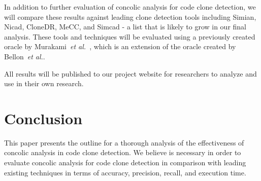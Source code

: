 \documentclass{sig-alternate}
\begin{document}
In addition to further evaluation of concolic analysis for code clone detection, we will compare these results against leading clone detection tools including Simian, Nicad, CloneDR, MeCC, and Simcad - a list that is likely to grow in our final analysis. These tools and techniques will be evaluated using a previously created oracle by Murakami~\emph{et al.}~\cite{Murakami:2014:DCR:2597073.2597133}, which is an extension of the oracle created by Bellon~\emph{et al.}\cite{Bellon07comparisonand}.


All results will be published to our project website for researchers to analyze and use in their own research.



\section{Conclusion}

This paper presents the outline for a thorough analysis of the effectiveness of concolic analysis in code clone detection. We believe is necessary in order to evaluate concolic analysis for code clone detection in comparison with leading existing techniques in terms of accuracy, precision, recall, and execution time.






\end{document}
